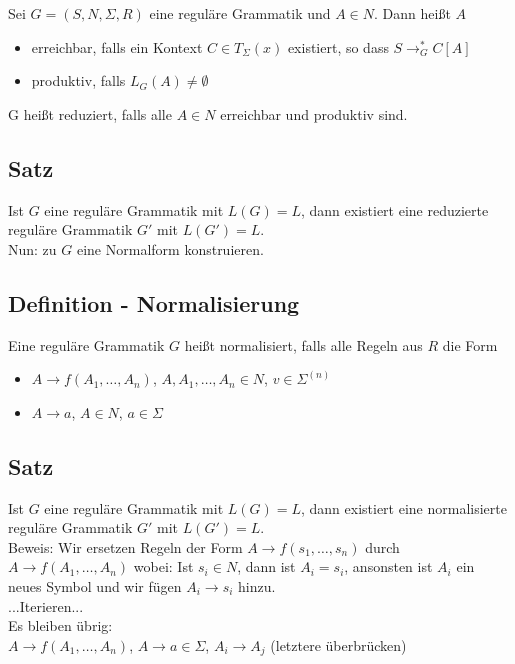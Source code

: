 \documentclass[titlepage]{article}
\begin{document}
Sei $G = (S,N,\Sigma,R)$ eine regul\"are Grammatik und $ A \in N $.
Dann hei\ss t $A$
\begin{itemize}
    \item erreichbar, falls ein Kontext $C \in T_\Sigma(x)$ existiert, so dass
        $S \to_G^\ast C[A]$
    \item produktiv, falls $L_G(A) \neq \emptyset$
\end{itemize}

G hei\ss t reduziert, falls alle $A \in N$ erreichbar und produktiv sind.

\subsection{Satz}

Ist $G$ eine regul\"are Grammatik mit $L(G) = L$, dann existiert eine reduzierte regul\"are 
Grammatik $G'$ mit $L(G') = L$.\\

Nun: zu $G$ eine \glqq Normalform \grqq konstruieren.

\subsection{Definition - Normalisierung}

Eine regul\"are Grammatik $G$ hei\ss t normalisiert, falls alle Regeln aus $R$ die Form
\begin{itemize}
    \item $A \to f(A_1, \dots, A_n)$, $A, A_1, \dots, A_n \in N$, $v \in \Sigma^{(n)}$
    \item $A \to a$, $A \in N$, $a \in \Sigma$
\end{itemize}

\subsection{Satz}

Ist $G$ eine regul\"are Grammatik mit $L(G) = L$, dann existiert eine normalisierte regul\"are 
Grammatik $G'$ mit $L(G') = L$.\\

Beweis: Wir ersetzen Regeln der Form 
$A \to f(s_1, \dots, s_n)$ durch
$A \to f(A_1, \dots, A_n)$ wobei:
Ist $s_i \in N$, dann ist $A_i= s_i$, ansonsten ist $A_i$ ein neues Symbol und wir f\"ugen 
$A_i \to s_i$ hinzu.\\
...Iterieren...\\

Es bleiben \"ubrig:\\
$A \to f(A_1, \dots, A_n)$, $A \to a \in \Sigma$, $A_i \to A_j$ (letztere \"uberbr\"ucken)\\
\end{document}
